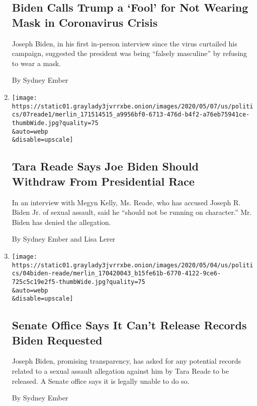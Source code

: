 \begin{enumerate}
  \hypertarget{biden-calls-trump-a-fool-for-not-wearing-mask-in-coronavirus-crisis}{%
  \subsection{Biden Calls Trump a `Fool' for Not Wearing Mask in
  Coronavirus
  Crisis}\label{biden-calls-trump-a-fool-for-not-wearing-mask-in-coronavirus-crisis}}

  Joseph Biden, in his first in-person interview since the virus
  curtailed his campaign, suggested the president was being ``falsely
  masculine'' by refusing to wear a mask.

  By Sydney Ember
\item
  \href{/2020/05/07/us/politics/tara-reade-megyn-kelly-interview.html}{}

  \texttt{[image: https://static01.graylady3jvrrxbe.onion/images/2020/05/07/us/politics/07reade1/merlin\_171514515\_a9956bf0-6713-476d-b4f2-a76eb75941ce-thumbWide.jpg?quality=75\\\&auto=webp\\\&disable=upscale]}

  \hypertarget{tara-reade-says-joe-biden-should-withdraw-from-presidential-race}{%
  \subsection{Tara Reade Says Joe Biden Should Withdraw From
  Presidential
  Race}\label{tara-reade-says-joe-biden-should-withdraw-from-presidential-race}}

  In an interview with Megyn Kelly, Ms. Reade, who has accused Joseph R.
  Biden Jr. of sexual assault, said he ``should not be running on
  character.'' Mr. Biden has denied the allegation.

  By Sydney Ember and Lisa Lerer
\item
  \href{/2020/05/04/us/politics/joe-biden-tara-reade-sexual-assault.html}{}

  \texttt{[image: https://static01.graylady3jvrrxbe.onion/images/2020/05/04/us/politics/04biden-reade/merlin\_170420043\_b15fe61b-6770-4122-9ce6-725c5c19e2f5-thumbWide.jpg?quality=75\\\&auto=webp\\\&disable=upscale]}

  \hypertarget{senate-office-says-it-cant-release-records-biden-requested}{%
  \subsection{Senate Office Says It Can't Release Records Biden
  Requested}\label{senate-office-says-it-cant-release-records-biden-requested}}

  Joseph Biden, promising transparency, has asked for any potential
  records related to a sexual assault allegation against him by Tara
  Reade to be released. A Senate office says it is legally unable to do
  so.

  By Sydney Ember
\end{enumerate}

